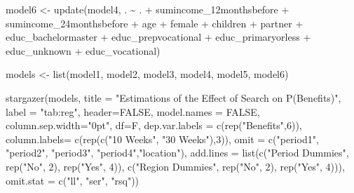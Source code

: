 \documentclass[
]{article}
\newenvironment{Shaded}{\begin{snugshade}}{\end{snugshade}}
\newcommand{\AttributeTok}[1]{\textcolor[rgb]{0.77,0.63,0.00}{#1}}
\newcommand{\ConstantTok}[1]{\textcolor[rgb]{0.00,0.00,0.00}{#1}}
\newcommand{\DecValTok}[1]{\textcolor[rgb]{0.00,0.00,0.81}{#1}}
\newcommand{\FunctionTok}[1]{\textcolor[rgb]{0.00,0.00,0.00}{#1}}
\newcommand{\NormalTok}[1]{#1}
\newcommand{\OtherTok}[1]{\textcolor[rgb]{0.56,0.35,0.01}{#1}}
\newcommand{\SpecialCharTok}[1]{\textcolor[rgb]{0.00,0.00,0.00}{#1}}
\newcommand{\StringTok}[1]{\textcolor[rgb]{0.31,0.60,0.02}{#1}}
\let\oldShaded\Shaded
\let\endoldShaded\endShaded
\renewenvironment{Shaded}{\footnotesize\oldShaded}{\endoldShaded}
\begin{document}
\begin{Shaded}
\begin{Highlighting}[]
\NormalTok{model6 }\OtherTok{\textless{}{-}} \FunctionTok{update}\NormalTok{(model4, . }\SpecialCharTok{\textasciitilde{}}\NormalTok{ . }\SpecialCharTok{+}\NormalTok{ sumincome\_12monthsbefore }\SpecialCharTok{+} 
\NormalTok{                     sumincome\_24monthsbefore }\SpecialCharTok{+}\NormalTok{ age }\SpecialCharTok{+}\NormalTok{ female }\SpecialCharTok{+}\NormalTok{ children }\SpecialCharTok{+} 
\NormalTok{                     partner }\SpecialCharTok{+}\NormalTok{ educ\_bachelormaster }\SpecialCharTok{+}\NormalTok{ educ\_prepvocational }\SpecialCharTok{+}
\NormalTok{                     educ\_primaryorless }\SpecialCharTok{+}\NormalTok{ educ\_unknown }\SpecialCharTok{+}\NormalTok{ educ\_vocational)}

\NormalTok{models }\OtherTok{\textless{}{-}} \FunctionTok{list}\NormalTok{(model1, model2, model3, model4, model5, model6)}
\end{Highlighting}
\end{Shaded}

\begin{Shaded}
\begin{Highlighting}[]
\FunctionTok{stargazer}\NormalTok{(models, }\AttributeTok{title =} \StringTok{"Estimations of the Effect of Search on P(Benefits)"}\NormalTok{,}
          \AttributeTok{label =} \StringTok{"tab:reg"}\NormalTok{, }\AttributeTok{header=}\ConstantTok{FALSE}\NormalTok{, }\AttributeTok{model.names =} \ConstantTok{FALSE}\NormalTok{,}
          \AttributeTok{column.sep.width=}\StringTok{"0pt"}\NormalTok{,}
          \AttributeTok{df=}\NormalTok{F,}
          \AttributeTok{dep.var.labels =} \FunctionTok{c}\NormalTok{(}\FunctionTok{rep}\NormalTok{(}\StringTok{"Benefits"}\NormalTok{,}\DecValTok{6}\NormalTok{)),}
          \AttributeTok{column.labels=} \FunctionTok{c}\NormalTok{(}\FunctionTok{rep}\NormalTok{(}\FunctionTok{c}\NormalTok{(}\StringTok{"10 Weeks"}\NormalTok{, }\StringTok{"30 Weeks"}\NormalTok{),}\DecValTok{3}\NormalTok{)),}
          \AttributeTok{omit =} \FunctionTok{c}\NormalTok{(}\StringTok{"period1"}\NormalTok{, }\StringTok{"period2"}\NormalTok{, }\StringTok{"period3"}\NormalTok{, }\StringTok{"period4"}\NormalTok{,}\StringTok{"location"}\NormalTok{),}
          \AttributeTok{add.lines =} \FunctionTok{list}\NormalTok{(}\FunctionTok{c}\NormalTok{(}\StringTok{"Period Dummies"}\NormalTok{, }\FunctionTok{rep}\NormalTok{(}\StringTok{"No"}\NormalTok{, }\DecValTok{2}\NormalTok{), }\FunctionTok{rep}\NormalTok{(}\StringTok{"Yes"}\NormalTok{, }\DecValTok{4}\NormalTok{)),}
                            \FunctionTok{c}\NormalTok{(}\StringTok{"Region Dummies"}\NormalTok{, }\FunctionTok{rep}\NormalTok{(}\StringTok{"No"}\NormalTok{, }\DecValTok{2}\NormalTok{), }\FunctionTok{rep}\NormalTok{(}\StringTok{"Yes"}\NormalTok{, }\DecValTok{4}\NormalTok{))),}
          \AttributeTok{omit.stat =} \FunctionTok{c}\NormalTok{(}\StringTok{"ll"}\NormalTok{, }\StringTok{"ser"}\NormalTok{, }\StringTok{"rsq"}\NormalTok{))}
\end{Highlighting}
\end{Shaded}
\end{document}
